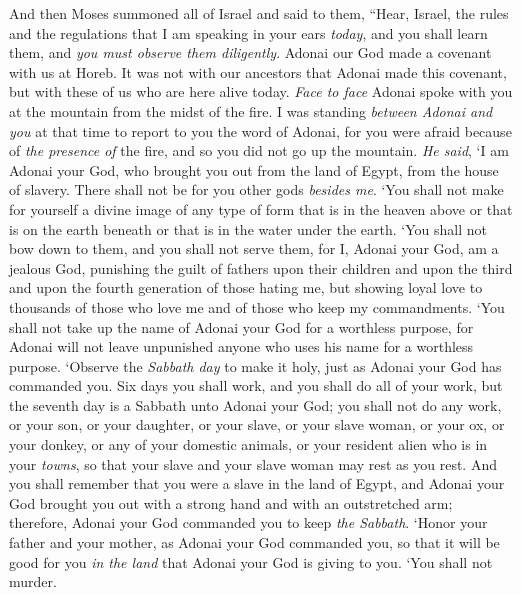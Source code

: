 \begin{biblechapter} %
 And then Moses summoned all of Israel and said to them, “Hear, Israel, the rules and the regulations that I am speaking in your ears \textit{today}, and you shall learn them, and \textit{you must observe them diligently}.
\verse Adonai our God made a covenant with us at Horeb.
\verse It was not with our ancestors that Adonai made this covenant, but with these of us who are here alive today.
\verse \textit{Face to face} Adonai spoke with you at the mountain from the midst of the fire.
\verse I was standing \textit{between Adonai and you} at that time to report to you the word of Adonai, for you were afraid because of \textit{the presence of} the fire, and so you did not go up the mountain. \textit{He said},
\verse ‘I am Adonai your God, who brought you out from the land of Egypt, from the house of slavery.
\verse There shall not be for you other gods \textit{besides me}.
\verse ‘You shall not make for yourself a divine image of any type of form that is in the heaven above or that is on the earth beneath or that is in the water under the earth.
\verse ‘You shall not bow down to them, and you shall not serve them, for I, Adonai your God, am a jealous God, punishing the guilt of fathers upon their children and upon the third and upon the fourth generation of those hating me,
\verse but showing loyal love to thousands of those who love me and of those who keep my commandments.
\verse ‘You shall not take up the name of Adonai your God for a worthless purpose, for Adonai will not leave unpunished anyone who uses his name for a worthless purpose.
\verse ‘Observe the \textit{Sabbath day} to make it holy, just as Adonai your God has commanded you.
\verse Six days you shall work, and you shall do all of your work,
\verse but the seventh day is a Sabbath unto Adonai your God; you shall not do any work, or your son, or your daughter, or your slave, or your slave woman, or your ox, or your donkey, or any of your domestic animals, or your resident alien who is in your \textit{towns}, so that your slave and your slave woman may rest as you rest.
\verse And you shall remember that you were a slave in the land of Egypt, and Adonai your God brought you out with a strong hand and with an outstretched arm; therefore, Adonai your God commanded you to keep \textit{the Sabbath}.
\verse ‘Honor your father and your mother, as Adonai your God commanded you, so that it will be good for you \textit{in the land} that Adonai your God is giving to you.
\verse ‘You shall not murder.

\end{biblechapter}
